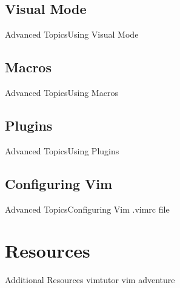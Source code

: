 \documentclass{beamer}
\begin{document}
\subsection{Visual Mode}
\begin{frame}[t]{Advanced Topics}{Using Visual Mode}
    
\end{frame}


\subsection{Macros}
\begin{frame}[t]{Advanced Topics}{Using Macros}
    
\end{frame}



\subsection{Plugins}
\begin{frame}[t]{Advanced Topics}{Using Plugins}
    
\end{frame}




\subsection{Configuring Vim}
\begin{frame}[t]{Advanced Topics}{Configuring Vim}
    .vimrc file
    
\end{frame}



\section{Resources}
\begin{frame} {Additional Resources}
    vimtutor
    vim adventure


\end{frame}
\end{document}
